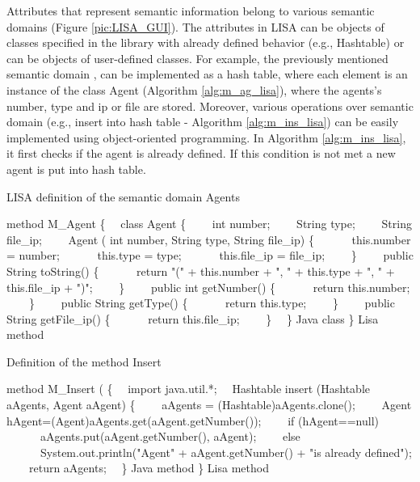 \documentclass[preprint, prX]{revtex4}
\begin{document}
Attributes that represent semantic information belong to various semantic domains (Figure \ref{pic:LISA_GUI}).
The attributes in LISA can be objects of classes specified in the library with already defined behavior (e.g., Hashtable) or can be objects of user-defined classes. For example, the previously mentioned semantic domain , can be implemented as a hash table, where each element is an instance of the class Agent (Algorithm \ref{alg:m_ag_lisa}), where the agents's number, type and ip or file are stored. Moreover, various operations over semantic domain (e.g., insert into hash table - Algorithm \ref{alg:m_ins_lisa}) can be easily
implemented using object-oriented programming. In Algorithm \ref{alg:m_ins_lisa}, it first checks if the agent is already defined. If this condition is not met a new agent is put into hash table.



\begin{algorithm}[tbh]
\caption{LISA definition of the semantic domain Agents}
\label{alg:m_ag_lisa}
\footnotesize
\begin{algorithmic}[1]
\STATE method M\_Agent \{
\STATE \ \ class Agent \{
\STATE \ \ \ \ int number;
\STATE \ \ \ \ String type;
\STATE \ \ \ \ String file\_ip;
\STATE \ \ \ \ Agent ( int number, String type, String file\_ip) \{
\STATE \ \ \ \ \ \ this.number = number;
\STATE \ \ \ \ \ \ this.type = type;
\STATE \ \ \ \ \ \ this.file\_ip = file\_ip;
\STATE \ \ \ \ \}
\STATE \ \ \ \ public String toString() \{
\STATE \ \ \ \ \ \ return "(" + this.number + ", " + this.type + ", " + this.file\_ip + ")";
\STATE \ \ \ \ \}
\STATE \ \ \ \ public int getNumber() \{
\STATE \ \ \ \ \ \ return this.number;
\STATE \ \ \ \ \}
\STATE \ \ \ \ public String getType() \{
\STATE \ \ \ \ \ \ return this.type;
\STATE \ \ \ \ \}
\STATE \ \ \ \ public String getFile\_ip() \{
\STATE \ \ \ \ \ \ return this.file\_ip;
\STATE \ \ \ \ \}
\STATE \ \ \}  Java class
\STATE \}  Lisa method
\end{algorithmic}
\normalsize
\end{algorithm}

\begin{algorithm}[tbh]
\caption{Definition of the method Insert}
\label{alg:m_ins_lisa}
\footnotesize
\begin{algorithmic}[1]
\STATE method M\_Insert ( \{
\STATE \ \ import java.util.*;
\STATE \ \ Hashtable insert (Hashtable aAgents, Agent aAgent) \{
\STATE \ \ \ \ aAgents = (Hashtable)aAgents.clone();
\STATE \ \ \ \ Agent hAgent=(Agent)aAgents.get(aAgent.getNumber());
\STATE \ \ \ \ if (hAgent==null)
\STATE \ \ \ \ \ \ aAgents.put(aAgent.getNumber(), aAgent);
\STATE \ \ \ \ else
\STATE \ \ \ \ \ \ System.out.println("Agent" + aAgent.getNumber() + "is already defined");
\STATE \ \ \ \ return aAgents;
\STATE \ \ \}  Java method
\STATE \}  Lisa method
\end{algorithmic}
\normalsize
\end{algorithm}
\end{document}
